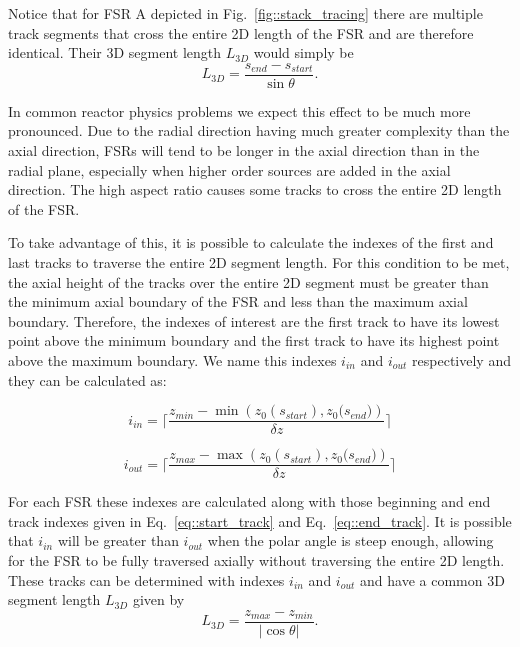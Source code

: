 Notice that for FSR A depicted in Fig.~\ref{fig::stack_tracing} there are multiple track segments that cross the entire 2D length of the FSR and are therefore identical. Their 3D segment length $L_{3D}$ would simply be
\begin{equation}
L_{3D} = \frac{s_{\textit{end}} - s_{\textit{start}}}{\sin{\theta}}.
\end{equation}

In common reactor physics problems we expect this effect to be much more pronounced. Due to the radial direction having much greater complexity than the axial direction, FSRs will tend to be longer in the axial direction than in the radial plane, especially when higher order sources are added in the axial direction. The high aspect ratio causes some tracks to cross the entire 2D length of the FSR.

To take advantage of this, it is possible to calculate the indexes of the first and last tracks to traverse the entire 2D segment length. For this condition to be met, the axial height of the tracks over the entire 2D segment must be greater than the minimum axial boundary of the FSR and less than the maximum axial boundary. Therefore, the indexes of interest are the first track to have its lowest point above the minimum boundary and the first track to have its highest point above the maximum boundary. We name this indexes $i_{\textit{in}}$ and $i_{\textit{out}}$ respectively and they can be calculated as:

\begin{equation}
i_{\textit{in}} = \Bigg\lceil\frac{z_{\textit{min}} - \min\left({z_0(s_{\textit{start}}), z_0(s_{\textit{end}}})\right) }{\delta z}\Bigg\rceil
\end{equation}

\begin{equation}
i_{\textit{out}} = \Bigg\lceil\frac{z_{\textit{max}} - \max\left({z_0(s_{\textit{start}}), z_0(s_{\textit{end}}})\right) }{\delta z}\Bigg\rceil
\end{equation}

For each FSR these indexes are calculated along with those beginning and end track indexes given in Eq.~\ref{eq::start_track} and Eq.~\ref{eq::end_track}. It is possible that $i_{\textit{in}}$ will be greater than $i_{\textit{out}}$ when the polar angle is steep enough, allowing for the FSR to be fully traversed axially without traversing the entire 2D length. These tracks can be determined with indexes $i_{\textit{in}}$ and $i_{\textit{out}}$ and have a common 3D segment length $L_{3D}$ given by
\begin{equation}
L_{3D} = \frac{z_{\textit{max}} - z_{\textit{min}}}{\left| \cos{\theta}\right|}.
\end{equation}

